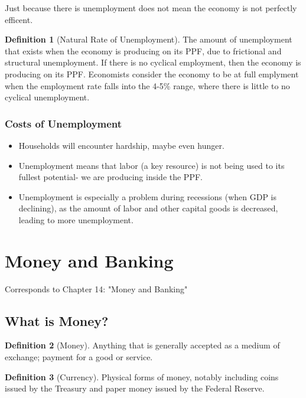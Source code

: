 \documentclass[12pt, a4paper]{article}
\theoremstyle{definition}
\newtheorem{definition}{Definition}
\begin{document}
Just because there is unemployment does not mean the economy is not perfectly efficent.

\begin{definition}[Natural Rate of Unemployment]
    The amount of unemployment that exists when the economy is producing on its PPF, due to frictional and structural unemployment.
    If there is no cyclical employment, then the economy is producing on its PPF.
    Economists consider the economy to be at full emplyment when the employment rate falls into the 4-5\% range, where there is little to no cyclical unemployment.
\end{definition}

\subsubsection{Costs of Unemployment}
\begin{itemize}
    \item Households will encounter hardship, maybe even hunger.
    \item Unemployment means that labor (a key resource) is not being used to its fullest potential- we are producing inside the PPF.
    \item Unemployment is especially a problem during recessions (when GDP is declining), as the amount of labor and other capital goods is decreased, leading to more unemployment.
\end{itemize}

\newpage

\section{Money and Banking}
Corresponds to Chapter 14: "Money and Banking"

\subsection{What is Money?}
\begin{definition}[Money]
    Anything that is generally accepted as a medium of exchange; payment for a good or service.
\end{definition}

\begin{definition}[Currency]
    Physical forms of money, notably including coins issued by the Treasury and paper money issued by the Federal Reserve.
\end{definition}
\end{document}
